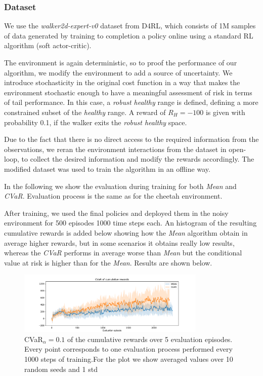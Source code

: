 \subsubsection{Dataset}
We use the \textit{walker2d-expert-v0} dataset from D4RL, which consists of 1M samples of data generated by
training to completion a policy online using a standard RL algorithm (soft actor-critic).

The environment is again deterministic, so to proof the performance of our algorithm, we modify the environment to
add a source of uncertainty. We introduce stochasticity in the original cost function in a way that 
makes the environment stochastic enough to have a meaningful assessment of risk in terms of 
tail performance.
In this case, a \textit{robust healthy} range is defined, defining a more constrained subset of the \textit{healthy} range.
A reward of $R_H=-100$ is given with probability 0.1, if the walker exits the \textit{robust healthy} space.

Due to the fact that there is no direct access to the required information from the observations,
we reran the environment interactions from the dataset in open-loop, to collect the desired information and 
modify the rewards accordingly.
The modified dataset was used to train the algorithm in an offline way.

In the following we show the evaluation during training for both \textit{Mean} and
\textit{CVaR}.
Evaluation process is the same as for the cheetah environment.

After training, we used the final policies and deployed them in the noisy environment for 500 episodes 
1000 time steps each. An histogram of the resulting cumulative rewards is added below showing
how the \textit{Mean} algorithm obtain in average higher rewards, but in some scenarios it 
obtains really low results, whereas the \textit{CVaR} performs in average worse than \textit{Mean} 
but the conditional value at risk is higher than for the \textit{Mean}.
Results are shown below.


\begin{figure}[ht]
    \centering
    \includegraphics[width=0.8\textwidth]{images/Walker_offpolicy_expert/cvar_train_withstds.pdf}
    \caption{CVaR$_\alpha=0.1$ of the cumulative rewards over 5 evaluation episodes.
    Every point corresponds to one evaluation process performed every 1000 steps of training.For the plot we
    show averaged values over 10 random seeds and 1 std}
    \label{fig:cvar_walker}

\end{figure}

